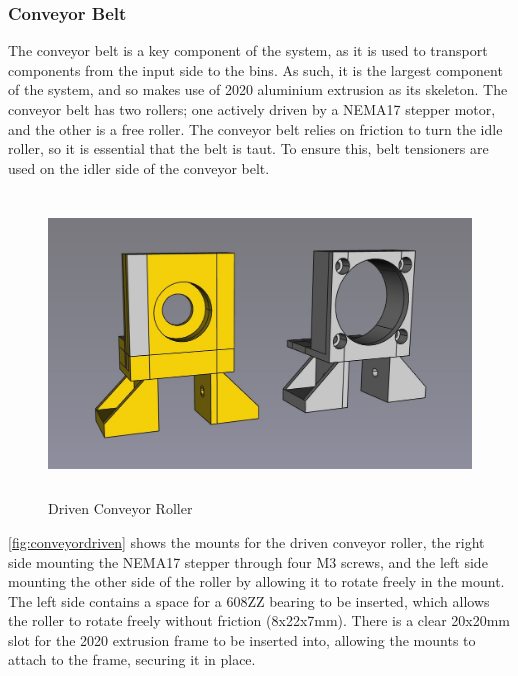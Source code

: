 \subsubsection{Conveyor Belt}
\label{sec:conveyor-belt}
The conveyor belt is a key component of the system, as it is used to transport components from the input side to the bins. As such, it is the largest component of the system, and so makes use of 2020 aluminium extrusion as its skeleton. The conveyor belt has two rollers; one actively driven by a NEMA17 stepper motor, and the other is a free roller. The conveyor belt relies on friction to turn the idle roller, so it is essential that the belt is taut. To ensure this, belt tensioners are used on the idler side of the conveyor belt.

\begin{figure}[H]
    \begin{minipage}[h]{0.95\textwidth}
        \centering
        \includegraphics[height=8cm]{imgs/freecad/conveyor_driven.jpg}
        \caption{Driven Conveyor Roller}
        \label{fig:conveyordriven}
    \end{minipage}
\end{figure}

\autoref{fig:conveyordriven} shows the mounts for the driven conveyor roller, the right side mounting the NEMA17 stepper through four M3 screws, and the left side mounting the other side of the roller by allowing it to rotate freely in the mount. The left side contains a space for a 608ZZ bearing to be inserted, which allows the roller to rotate freely without friction (8x22x7mm). There is a clear 20x20mm slot for the 2020 extrusion frame to be inserted into, allowing the mounts to attach to the frame, securing it in place. 

